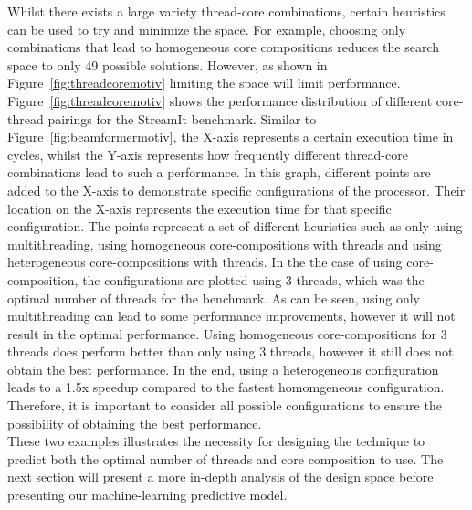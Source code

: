 Whilst there exists a large variety thread-core combinations, certain heuristics can be used to try and minimize the space.
For example, choosing only combinations that lead to homogeneous core compositions reduces the search space to only 49 possible solutions.
However, as shown in Figure~\ref{fig:threadcoremotiv} limiting the space will limit performance.
Figure~\ref{fig:threadcoremotiv} shows the performance distribution of different core-thread pairings for the  StreamIt benchmark.
Similar to Figure~\ref{fig:beamformermotiv}, the X-axis represents a certain execution time in cycles, whilst the Y-axis represents how frequently different thread-core combinations lead to such a performance.
In this graph, different points are added to the X-axis to demonstrate specific configurations of the processor.
Their location on the X-axis represents the execution time for that specific configuration.
The points represent a set of different heuristics such as only using multithreading, using homogeneous core-compositions with threads and using heterogeneous core-compositions with threads.
In the the case of using core-composition, the configurations are plotted using 3 threads, which was the optimal number of threads for the benchmark.
As can be seen, using only multithreading can lead to some performance improvements, however it will not result in the optimal performance.
Using homogeneous core-compositions for 3 threads does perform better than only using 3 threads, however it still does not obtain the best performance.
In the end, using a heterogeneous configuration leads to a 1.5x speedup compared to the fastest homomgeneous configuration.
Therefore, it is important to consider all possible configurations to ensure the possibility of obtaining the best performance.\\

These two examples illustrates the necessity for designing the technique to predict both the optimal number of threads and core composition to use.
The next section will present a more in-depth analysis of the design space before presenting our machine-learning predictive model.

